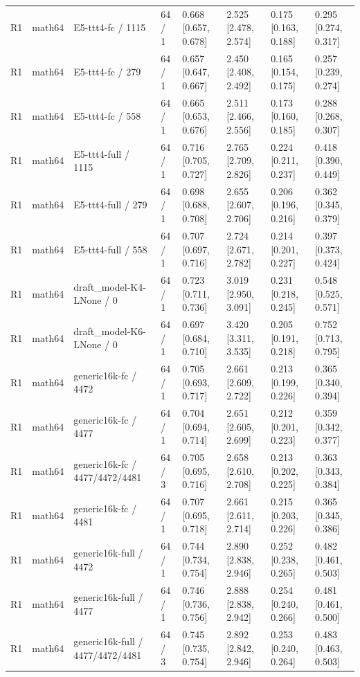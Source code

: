 \begin{tabular}{llllllll}
R1 & math64 & E5-ttt4-fc / 1115 & 64 / 1 & 0.668 [0.657, 0.678] & 2.525 [2.478, 2.574] & 0.175 [0.163, 0.188] & 0.295 [0.274, 0.317] \\
R1 & math64 & E5-ttt4-fc / 279 & 64 / 1 & 0.657 [0.647, 0.667] & 2.450 [2.408, 2.492] & 0.165 [0.154, 0.175] & 0.257 [0.239, 0.274] \\
R1 & math64 & E5-ttt4-fc / 558 & 64 / 1 & 0.665 [0.653, 0.676] & 2.511 [2.466, 2.556] & 0.173 [0.160, 0.185] & 0.288 [0.268, 0.307] \\
R1 & math64 & E5-ttt4-full / 1115 & 64 / 1 & 0.716 [0.705, 0.727] & 2.765 [2.709, 2.826] & 0.224 [0.211, 0.237] & 0.418 [0.390, 0.449] \\
R1 & math64 & E5-ttt4-full / 279 & 64 / 1 & 0.698 [0.688, 0.708] & 2.655 [2.607, 2.706] & 0.206 [0.196, 0.216] & 0.362 [0.345, 0.379] \\
R1 & math64 & E5-ttt4-full / 558 & 64 / 1 & 0.707 [0.697, 0.716] & 2.724 [2.671, 2.782] & 0.214 [0.201, 0.227] & 0.397 [0.373, 0.424] \\
R1 & math64 & draft\_model-K4-LNone / 0 & 64 / 1 & 0.723 [0.711, 0.736] & 3.019 [2.950, 3.091] & 0.231 [0.218, 0.245] & 0.548 [0.525, 0.571] \\
R1 & math64 & draft\_model-K6-LNone / 0 & 64 / 1 & 0.697 [0.684, 0.710] & 3.420 [3.311, 3.535] & 0.205 [0.191, 0.218] & 0.752 [0.713, 0.795] \\
R1 & math64 & generic16k-fc / 4472 & 64 / 1 & 0.705 [0.693, 0.717] & 2.661 [2.609, 2.722] & 0.213 [0.199, 0.226] & 0.365 [0.340, 0.394] \\
R1 & math64 & generic16k-fc / 4477 & 64 / 1 & 0.704 [0.694, 0.714] & 2.651 [2.605, 2.699] & 0.212 [0.201, 0.223] & 0.359 [0.342, 0.377] \\
R1 & math64 & generic16k-fc / 4477/4472/4481 & 64 / 3 & 0.705 [0.695, 0.716] & 2.658 [2.610, 2.708] & 0.213 [0.202, 0.225] & 0.363 [0.343, 0.384] \\
R1 & math64 & generic16k-fc / 4481 & 64 / 1 & 0.707 [0.695, 0.718] & 2.661 [2.611, 2.714] & 0.215 [0.203, 0.226] & 0.365 [0.345, 0.386] \\
R1 & math64 & generic16k-full / 4472 & 64 / 1 & 0.744 [0.734, 0.754] & 2.890 [2.838, 2.946] & 0.252 [0.238, 0.265] & 0.482 [0.461, 0.503] \\
R1 & math64 & generic16k-full / 4477 & 64 / 1 & 0.746 [0.736, 0.756] & 2.888 [2.838, 2.942] & 0.254 [0.240, 0.266] & 0.481 [0.461, 0.500] \\
R1 & math64 & generic16k-full / 4477/4472/4481 & 64 / 3 & 0.745 [0.735, 0.754] & 2.892 [2.842, 2.946] & 0.253 [0.240, 0.264] & 0.483 [0.463, 0.503] \\

\end{tabular}
